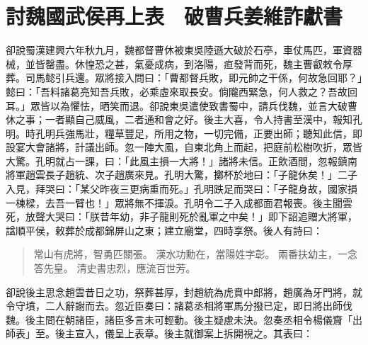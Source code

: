 
\chapter{討魏國武侯再上表　破曹兵姜維詐獻書}

卻說蜀漢建興六年秋九月，魏都督曹休被東吳陸遜大破於石亭，車仗馬匹，軍資器械，並皆罄盡。休惶恐之甚，氣憂成病，到洛陽，疸發背而死，魏主曹叡敕令厚葬。司馬懿引兵還。眾將接入問曰：「曹都督兵敗，即元帥之干係，何故急回耶？」懿曰：「吾料諸葛亮知吾兵敗，必乘虛來取長安。倘隴西緊急，何人救之？吾故回耳。」眾皆以為懼怯，晒笑而退。卻說東吳遣使致書蜀中，請兵伐魏，並言大破曹休之事；一者顯自己威風，二者通和會之好。後主大喜，令人持書至漢中，報知孔明。時孔明兵強馬壯，糧草豐足，所用之物，一切完備，正要出師；聽知此信，即設宴大會諸將，計議出師。忽一陣大風，自東北角上而起，把庭前松樹吹折，眾皆大驚。孔明就占一課，曰：「此風主損一大將！」諸將未信。正飲酒間，忽報鎮南將軍趙雲長子趙統、次子趙廣來見。孔明大驚，擲杯於地曰：「子龍休矣！」二子入見，拜哭曰：「某父昨夜三更病重而死。」孔明跌足而哭曰：「子龍身故，國家損一棟樑，去吾一臂也！」眾將無不揮淚。孔明令二子入成都面君報喪。後主聞雲死，放聲大哭曰：「朕昔年幼，非子龍則死於亂軍之中矣！」即下詔追贈大將軍，諡順平侯，敕葬於成都錦屏山之東；建立廟堂，四時享祭。後人有詩曰：

\begin{quote}
常山有虎將，智勇匹關張。
漢水功勳在，當陽姓字彰。
兩番扶幼主，一念答先皇。
清史書忠烈，應流百世芳。
\end{quote}

卻說後主思念趙雲昔日之功，祭葬甚厚，封趙統為虎賁中郎將，趙廣為牙門將，就令守墳，二人辭謝而去。忽近臣奏曰：諸葛丞相將軍馬分撥已定，即日將出師伐魏。後主問在朝諸臣，諸臣多言未可輕動。後主疑慮未決。忽奏丞相令楊儀齎「出師表」至。後主宣入，儀呈上表章。後主就御案上拆開視之。其表曰：

